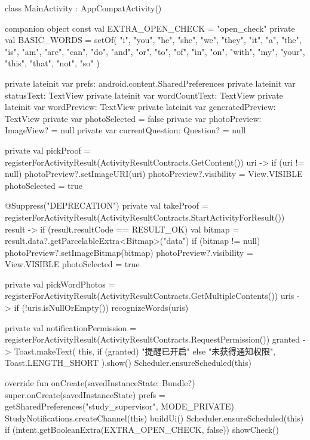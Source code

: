 class MainActivity : AppCompatActivity() {

    companion object {
        const val EXTRA_OPEN_CHECK = "open_check"
        private val BASIC_WORDS = setOf(
            "i", "you", "he", "she", "we", "they", "it",
            "a", "the", "is", "am", "are", "can", "do",
            "and", "or", "to", "of", "in", "on", "with",
            "my", "your", "this", "that", "not", "so"
        )
    }

    private lateinit var prefs: android.content.SharedPreferences
    private lateinit var statusText: TextView
    private lateinit var wordCountText: TextView
    private lateinit var wordPreview: TextView
    private lateinit var generatedPreview: TextView
    private var photoSelected = false
    private var photoPreview: ImageView? = null
    private var currentQuestion: Question? = null

    private val pickProof = registerForActivityResult(ActivityResultContracts.GetContent()) { uri ->
        if (uri != null) {
            photoPreview?.setImageURI(uri)
            photoPreview?.visibility = View.VISIBLE
            photoSelected = true
        }
    }

    @Suppress("DEPRECATION")
    private val takeProof = registerForActivityResult(ActivityResultContracts.StartActivityForResult()) { result ->
        if (result.resultCode == RESULT_OK) {
            val bitmap = result.data?.getParcelableExtra<Bitmap>("data")
            if (bitmap != null) {
                photoPreview?.setImageBitmap(bitmap)
                photoPreview?.visibility = View.VISIBLE
                photoSelected = true
            }
        }
    }

    private val pickWordPhotos =
        registerForActivityResult(ActivityResultContracts.GetMultipleContents()) { uris ->
            if (!uris.isNullOrEmpty()) recognizeWords(uris)
        }

    private val notificationPermission =
        registerForActivityResult(ActivityResultContracts.RequestPermission()) { granted ->
            Toast.makeText(
                this,
                if (granted) "提醒已开启" else "未获得通知权限",
                Toast.LENGTH_SHORT
            ).show()
            Scheduler.ensureScheduled(this)
        }

    override fun onCreate(savedInstanceState: Bundle?) {
        super.onCreate(savedInstanceState)
        prefs = getSharedPreferences("study_supervisor", MODE_PRIVATE)
        StudyNotifications.createChannel(this)
        buildUi()
        Scheduler.ensureScheduled(this)
        if (intent.getBooleanExtra(EXTRA_OPEN_CHECK, false)) showCheck()
    }

}
